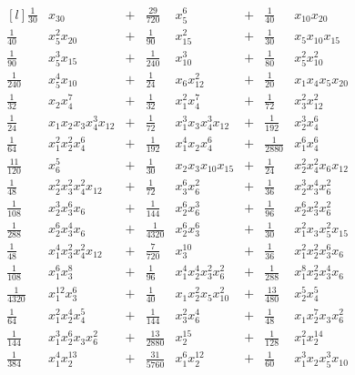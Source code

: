 \documentclass{article}
\begin{document}
$$
\begin{matrix*}[l]
    \frac{1}{30}&x_{30}&+&\frac{29}{720}&x_{5}^{6}&+&\frac{1}{40}&x_{10} x_{20}\\
\frac{1}{40}&x_{5}^{2} x_{20}&+&\frac{1}{90}&x_{15}^{2}&+&\frac{1}{30}&x_{5} x_{10} x_{15}\\
\frac{1}{90}&x_{5}^{3} x_{15}&+&\frac{1}{240}&x_{10}^{3}&+&\frac{1}{80}&x_{5}^{2} x_{10}^{2}\\
\frac{1}{240}&x_{5}^{4} x_{10}&+&\frac{1}{24}&x_{6} x_{12}^{2}&+&\frac{1}{20}&x_{1} x_{4} x_{5} x_{20}\\
\frac{1}{32}&x_{2} x_{4}^{7}&+&\frac{1}{32}&x_{1}^{2} x_{4}^{7}&+&\frac{1}{72}&x_{3}^{2} x_{12}^{2}\\
\frac{1}{24}&x_{1} x_{2} x_{3} x_{4}^{3} x_{12}&+&\frac{1}{72}&x_{1}^{3} x_{3} x_{4}^{3} x_{12}&+&\frac{1}{192}&x_{2}^{3} x_{4}^{6}\\
\frac{1}{64}&x_{1}^{2} x_{2}^{2} x_{4}^{6}&+&\frac{1}{192}&x_{1}^{4} x_{2} x_{4}^{6}&+&\frac{1}{2880}&x_{1}^{6} x_{4}^{6}\\
\frac{11}{120}&x_{6}^{5}&+&\frac{1}{30}&x_{2} x_{3} x_{10} x_{15}&+&\frac{1}{24}&x_{2}^{2} x_{4}^{2} x_{6} x_{12}\\
\frac{1}{48}&x_{2}^{2} x_{3}^{2} x_{4}^{2} x_{12}&+&\frac{1}{72}&x_{3}^{6} x_{6}^{2}&+&\frac{1}{36}&x_{2}^{3} x_{3}^{4} x_{6}^{2}\\
\frac{1}{108}&x_{2}^{3} x_{3}^{6} x_{6}&+&\frac{1}{144}&x_{2}^{6} x_{6}^{3}&+&\frac{1}{96}&x_{2}^{6} x_{3}^{2} x_{6}^{2}\\
\frac{1}{288}&x_{2}^{6} x_{3}^{4} x_{6}&+&\frac{1}{4320}&x_{2}^{6} x_{3}^{6}&+&\frac{1}{30}&x_{1}^{2} x_{3} x_{5}^{2} x_{15}\\
\frac{1}{48}&x_{1}^{4} x_{3}^{2} x_{4}^{2} x_{12}&+&\frac{7}{720}&x_{3}^{10}&+&\frac{1}{36}&x_{1}^{2} x_{2}^{2} x_{3}^{6} x_{6}\\
\frac{1}{108}&x_{1}^{6} x_{3}^{8}&+&\frac{1}{96}&x_{1}^{4} x_{2}^{4} x_{3}^{2} x_{6}^{2}&+&\frac{1}{288}&x_{1}^{8} x_{2}^{2} x_{3}^{4} x_{6}\\
\frac{1}{4320}&x_{1}^{12} x_{3}^{6}&+&\frac{1}{40}&x_{1} x_{2}^{2} x_{5} x_{10}^{2}&+&\frac{13}{480}&x_{2}^{5} x_{4}^{5}\\
\frac{1}{64}&x_{1}^{2} x_{2}^{4} x_{4}^{5}&+&\frac{1}{144}&x_{3}^{2} x_{6}^{4}&+&\frac{1}{48}&x_{1} x_{2}^{7} x_{3} x_{6}^{2}\\
\frac{1}{144}&x_{1}^{3} x_{2}^{6} x_{3} x_{6}^{2}&+&\frac{13}{2880}&x_{2}^{15}&+&\frac{1}{128}&x_{1}^{2} x_{2}^{14}\\
\frac{1}{384}&x_{1}^{4} x_{2}^{13}&+&\frac{31}{5760}&x_{1}^{6} x_{2}^{12}&+&\frac{1}{60}&x_{1}^{3} x_{2} x_{5}^{3} x_{10}\\

\end{matrix*}$$
\end{document}
